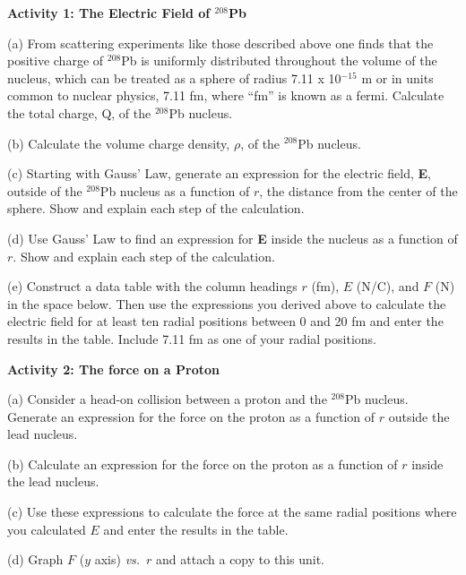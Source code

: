 \textbf{Activity 1: The Electric Field of \( ^{208} \)Pb}

(a) From scattering experiments like those described above one finds
that the positive charge of \( ^{208} \)Pb is uniformly distributed
throughout the volume of the nucleus, which can be treated as a sphere
of radius 7.11 x 10\( ^{-15} \) m or in units common to nuclear physics,
7.11 fm, where {}``fm'' is known as a fermi. Calculate the total
charge, Q, of the \( ^{208} \)Pb nucleus.
\vspace{30mm}

(b) Calculate the volume charge density, \( \rho  \), of the \( ^{208} \)Pb
nucleus.
\vspace{30mm}

(c) Starting with Gauss' Law, generate an expression for the electric
field, \textbf{E}, outside of the \( ^{208} \)Pb nucleus as a function
of $r$, the distance from the center of the sphere. Show and explain
each step of the calculation.
\vspace{2in}

(d) Use Gauss' Law to find an expression for \textbf{E} inside the
nucleus as a function of $r$. Show and explain each step of the calculation.
\vspace{2in}

(e) Construct a data table with the column headings $r$ (fm), $E$ (N/C),
and $F$ (N) in the space below. Then use the expressions you derived
above to calculate the electric field for at least ten radial positions
between 0 and 20 fm and enter the results in the table. Include 7.11
fm as one of your radial positions.
\vspace{3in}

\textbf{Activity 2: The force on a Proton}

(a) Consider a head-on collision between a proton and the \( ^{208} \)Pb
nucleus. Generate an expression for the force on the proton as a function
of $r$ outside the lead nucleus.
\vspace{20mm}

\vspace{1in}
(b) Calculate an expression for the force on the proton as a function
of $r$ inside the lead nucleus.
\vspace{30mm}

(c) Use these expressions to calculate the force at the same radial
positions where you calculated $E$ and enter the results in the table.

(d) Graph $F$ ($y$ axis) \textit{vs.}~$r$ and attach a copy to this unit.
\vspace{10mm}

